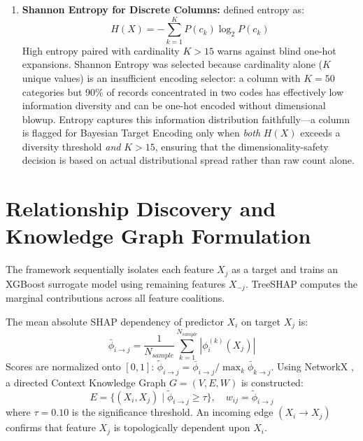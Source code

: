 \documentclass[MTech]{ugthesis}
\begin{document}
\begin{enumerate}
    \item \textbf{Shannon Entropy for Discrete Columns:} \citet{shannon1948mathematical} defined entropy as:
    \begin{equation}
        H(X) = -\sum_{k=1}^K P(c_k) \log_2 P(c_k)
    \end{equation}
    High entropy paired with cardinality $K > 15$ warns against blind one-hot expansions. Shannon Entropy was selected because cardinality alone ($K$ unique values) is an insufficient encoding selector: a column with $K = 50$ categories but 90\% of records concentrated in two codes has effectively low information diversity and can be one-hot encoded without dimensional blowup. Entropy captures this information distribution faithfully---a column is flagged for Bayesian Target Encoding only when \emph{both} $H(X)$ exceeds a diversity threshold \emph{and} $K > 15$, ensuring that the dimensionality-safety decision is based on actual distributional spread rather than raw count alone.
\end{enumerate}

\section{Relationship Discovery and Knowledge Graph Formulation}
The framework sequentially isolates each feature $X_j$ as a target and trains an XGBoost surrogate model \citep{chen2016xgboost} using remaining features $X_{-j}$. Tree\ac{SHAP} \citep{lundberg2020local} computes the marginal contributions across all feature coalitions. 

The mean absolute \ac{SHAP} dependency of predictor $X_i$ on target $X_j$ is:
\begin{equation}
    \bar{\phi}_{i \to j} = \frac{1}{N_{sample}} \sum_{k=1}^{N_{sample}} |\phi_i^{(k)}(X_j)|
\end{equation}
Scores are normalized onto $[0, 1]$: $\tilde{\phi}_{i \to j} = \bar{\phi}_{i \to j} / \max_k \bar{\phi}_{k \to j}$. Using NetworkX \citep{hagberg2008exploring}, a directed Context Knowledge Graph $G = (V, E, W)$ is constructed:
\begin{equation}
    E = \{(X_i, X_j) \mid \tilde{\phi}_{i \to j} \ge \tau\}, \quad w_{ij} = \tilde{\phi}_{i \to j}
\end{equation}
where $\tau = 0.10$ is the significance threshold. An incoming edge $(X_i \to X_j)$ confirms that feature $X_j$ is topologically dependent upon $X_i$.
\end{document}
